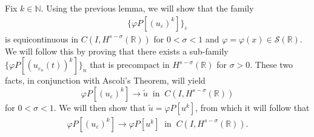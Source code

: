 \documentclass{beamer}
\newcommand{\rr}{\mathbb{R}}
\newcommand{\ee}{\varepsilon}
\begin{document}
\begin{frame}
Fix $k \in \mathbb{N}$. Using the previous lemma, we
		will show that the family
		\begin{equation*}
			\begin{split}
			 \{\varphi P[(u_\ee)^k]\}_\ee
		\end{split}
	\end{equation*}
		is equicontinuous in $C(I, H^{s-\sigma}(\rr))$ 
		for $0 < \sigma < 1$ and $\varphi = \varphi(x) \in \mathcal{S}(\rr)$.
		We will follow this by proving that
		there exists a sub-family $\{\varphi P[(u_{\ee_n}(t))^k]\}_n$
		that is precompact in $H^{s-\sigma}(\rr)$ for $\sigma > 0$. 
		These two facts, in conjunction with Ascoli's Theorem, will
		yield
		\begin{equation*}
			\label{hhstrong-conv2}
			\varphi P[(u_\ee)^k] \to \tilde{u}
			\; \; \text{in} \; \; C(I,H^{s-\sigma}(\rr))
		\end{equation*}
		for $0 < \sigma < 1$.
		We will then show that $\tilde{u} = \varphi P[u^k]$, from which it will
		follow that
		\begin{equation*}
			\label{hhphiplus}
			\begin{split}
				\varphi P[(u_\ee)^k] \to \varphi P[u^k]
				\; \; \text{in} \; \; C(I,H^{s-\sigma}(\rr)).
			\end{split}
		\end{equation*}
  \end{frame}

		

\end{document}
